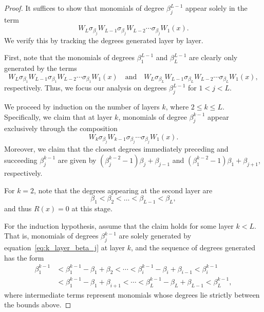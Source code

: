 \documentclass{article} %
\def\eqref#1{equation~\ref{#1}}
\theoremstyle{plain}%
\theoremstyle{definition}
\theoremstyle{remark}
\begin{document}
\begin{proof}
It suffices to show that monomials of degree $\beta_j^{L-1}$ appear solely in the term
\begin{equation}    
W_L \sigma_{\beta_j} W_{L-1} \sigma_{\beta_j} W_{L-2} \cdots \sigma_{\beta_j} W_1(x).
\end{equation}
We verify this by tracking the degrees generated layer by layer.

First, note that the monomials of degrees $\beta_1^{L-1}$ and $\beta_L^{L-1}$ are clearly only generated by the terms
\begin{equation}
W_L \sigma_{\beta_1} W_{L-1} \sigma_{\beta_1} W_{L-2} \cdots \sigma_{\beta_1} W_1(x) \quad\text{and}\quad
W_L \sigma_{\beta_L} W_{L-1} \sigma_{\beta_L} W_{L-2} \cdots \sigma_{\beta_L} W_1(x),
\end{equation}
respectively. Thus, we focus our analysis on degrees $\beta_j^{L-1}$ for $1 < j < L$.

We proceed by induction on the number of layers $k$, where $2 \leq k \leq L$. Specifically, we claim that at layer $k$, monomials of degree $\beta_j^{k-1}$ appear exclusively through the composition
\begin{equation}
    \label{eq:k_layer_beta_j}
W_k \sigma_{\beta_j} W_{k-1} \sigma_{\beta_j} \cdots \sigma_{\beta_j} W_1(x).
\end{equation}
Moreover, we claim that the closest degrees immediately preceding and succeeding $\beta_j^{k-1}$ are given by $(\beta_j^{k-2}-1)\beta_j + \beta_{j-1}$ and $ (\beta_1^{k-2}-1)\beta_1 + \beta_{j+1}$, respectively.

For $k=2$, note that the degrees appearing at the second layer are 
\begin{equation}    
\beta_1 < \beta_2 < \dots < \beta_{L-1} < \beta_L,
\end{equation}    
and thus $R(x)=0$ at this stage.

For the induction hypothesis, assume that the claim holds for some layer $k < L$. That is, monomials of degrees $\beta_j^{k-1}$ are solely generated by \eqref{eq:k_layer_beta_j}  at layer $k$, and the sequence of degrees generated has the form
\begin{equation}
\label{eq:monomial_deg_layer_k}
\begin{aligned}
\beta_1^{k-1} &< \beta_1^{k-1}-\beta_1+\beta_2 < \cdots < \beta_i^{k-1}-\beta_i+\beta_{i-1} < \beta_i^{k-1} \\
&< \beta_1^{k-1}-\beta_1+\beta_{i+1} < \cdots < \beta_L^{k-1}-\beta_L+\beta_{L-1} < \beta_L^{k-1},
\end{aligned}
\end{equation}
where intermediate terms represent monomials whose degrees lie strictly between the   bounds above.


\end{proof}
\end{document}
